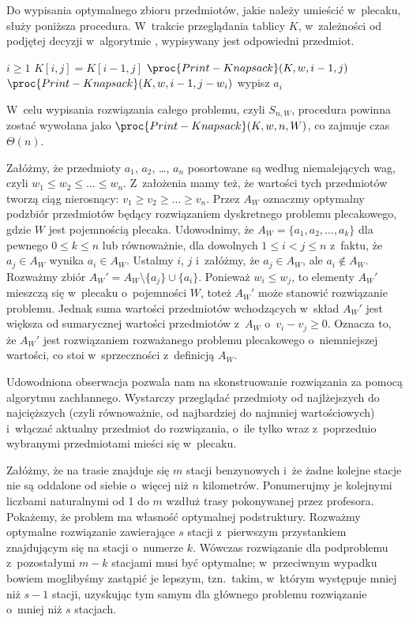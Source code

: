 Do wypisania optymalnego zbioru przedmiotów, jakie należy umieścić w~plecaku, służy poniższa procedura.
W~trakcie przeglądania tablicy $K$, w~zależności od podjętej decyzji w~algorytmie , wypisywany jest odpowiedni przedmiot.
\begin{codebox}
\li	\If $i\ge1$
\li		\Then \If $K[i,j]=K[i-1,j]$
\li				\Then $\proc{Print-Knapsack}(K,w,i-1,j)$
\li				\Else $\proc{Print-Knapsack}(K,w,i-1,j-w_i)$
\li					wypisz $a_i$
				\End
		\End
\end{codebox}
W~celu wypisania rozwiązania całego problemu, czyli $S_{n,W}$, procedura powinna zostać wywołana jako $\proc{Print-Knapsack}(K,w,n,W)$, co zajmuje czas $\Theta(n)$.

\exercise %
Załóżmy, że przedmioty $a_1$, $a_2$, \dots, $a_n$ posortowane są według niemalejących wag, czyli $w_1\le w_2\le\dots\le w_n$.
Z~założenia mamy też, że wartości tych przedmiotów tworzą ciąg nierosnący: $v_1\ge v_2\ge\dots\ge v_n$.
Przez $A_W$ oznaczmy optymalny podzbiór przedmiotów będący rozwiązaniem dyskretnego problemu plecakowego, gdzie $W$ jest pojemnością plecaka.
Udowodnimy, że $A_W=\{a_1,a_2,\dots,a_k\}$ dla pewnego $0\le k\le n$ lub równoważnie, dla dowolnych $1\le i<j\le n$ z~faktu, że $a_j\in A_W$ wynika $a_i\in A_W$.
Ustalmy $i$, $j$ i~załóżmy, że $a_j\in A_W$, ale $a_i\not\in A_W$.
Rozważmy zbiór $A_W'=A_W\setminus\{a_j\}\cup\{a_i\}$.
Ponieważ $w_i\le w_j$, to elementy $A_W'$ mieszczą się w~plecaku o~pojemności $W$, toteż $A_W'$ może stanowić rozwiązanie problemu.
Jednak suma wartości przedmiotów wchodzących w~skład $A_W'$ jest większa od sumarycznej wartości przedmiotów z~$A_W$ o~$v_i-v_j\ge0$.
Oznacza to, że $A_W'$ jest rozwiązaniem rozważanego problemu plecakowego o~niemniejszej wartości, co stoi w~sprzeczności z~definicją $A_W$.

Udowodniona obserwacja pozwala nam na skonstruowanie rozwiązania za pomocą algorytmu zachłannego.
Wystarczy przeglądać przedmioty od najlżejszych do najcięższych (czyli równoważnie, od najbardziej do najmniej wartościowych) i~włączać aktualny przedmiot do rozwiązania, o~ile tylko wraz z~poprzednio wybranymi przedmiotami mieści się w~plecaku.

\exercise %
Załóżmy, że na trasie znajduje się $m$ stacji benzynowych i~że żadne kolejne stacje nie są oddalone od siebie o~więcej niż $n$ kilometrów.
Ponumerujmy je kolejnymi liczbami naturalnymi od 1 do $m$ wzdłuż trasy pokonywanej przez profesora.
Pokażemy, że problem ma własność optymalnej podstruktury.
Rozważmy optymalne rozwiązanie zawierające $s$ stacji z~pierwszym przystankiem znajdującym się na stacji o~numerze $k$.
Wówczas rozwiązanie dla podproblemu z~pozostałymi $m-k$ stacjami musi być optymalne; w~przeciwnym wypadku bowiem moglibyśmy zastąpić je lepszym, tzn.\ takim, w~którym występuje mniej niż $s-1$ stacji, uzyskując tym samym dla głównego problemu rozwiązanie o~mniej niż $s$ stacjach.

